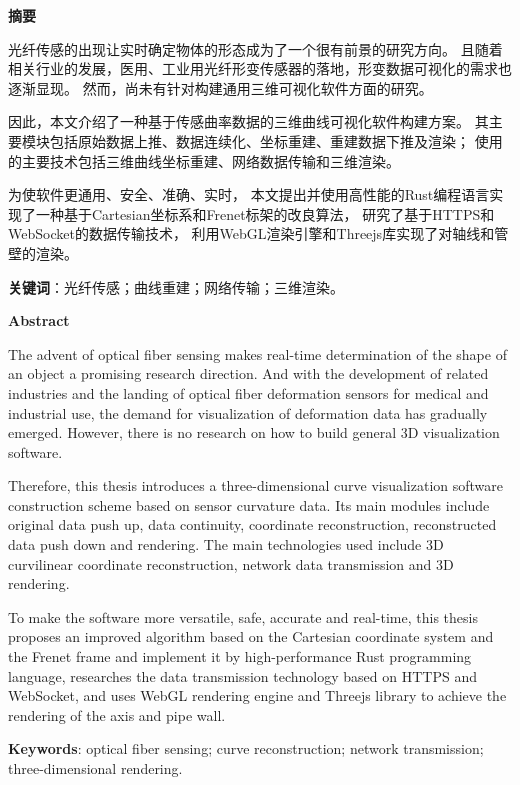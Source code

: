 \clearpage
\begin{center}
    \bfseries {} 摘要
\end{center}

光纤传感的出现让实时确定物体的形态成为了一个很有前景的研究方向。
且随着相关行业的发展，医用、工业用光纤形变传感器的落地，形变数据可视化的需求也逐渐显现。
然而，尚未有针对构建通用三维可视化软件方面的研究。

因此，本文介绍了一种基于传感曲率数据的三维曲线可视化软件构建方案。
其主要模块包括原始数据上推、数据连续化、坐标重建、重建数据下推及渲染；
使用的主要技术包括三维曲线坐标重建、网络数据传输和三维渲染。

为使软件更通用、安全、准确、实时，
本文提出并使用高性能的Rust编程语言实现了一种基于Cartesian坐标系和Frenet标架的改良算法，
研究了基于HTTPS和WebSocket的数据传输技术，
利用WebGL渲染引擎和Threejs库实现了对轴线和管壁的渲染。

\textbf{关键词}：光纤传感；曲线重建；网络传输；三维渲染。

\clearpage

\begin{center}
    \bfseries {} Abstract
\end{center}

The advent of optical fiber sensing makes real-time determination of the shape of an object a promising research direction.
And with the development of related industries and the landing of optical fiber deformation sensors for medical and industrial use, the demand for visualization of deformation data has gradually emerged.
However, there is no research on how to build general 3D visualization software.

Therefore, this thesis introduces a three-dimensional curve visualization software construction scheme based on sensor curvature data.
Its main modules include original data push up, data continuity, coordinate reconstruction, reconstructed data push down and rendering.
The main technologies used include 3D curvilinear coordinate reconstruction, network data transmission and 3D rendering.

To make the software more versatile, safe, accurate and real-time,
this thesis proposes an improved algorithm based on the Cartesian coordinate system and the Frenet frame and implement it by high-performance Rust programming language,
researches the data transmission technology based on HTTPS and WebSocket,
and uses WebGL rendering engine and Threejs library to achieve the rendering of the axis and pipe wall.

\textbf{Keywords}: optical fiber sensing; curve reconstruction; network transmission; three-dimensional rendering.